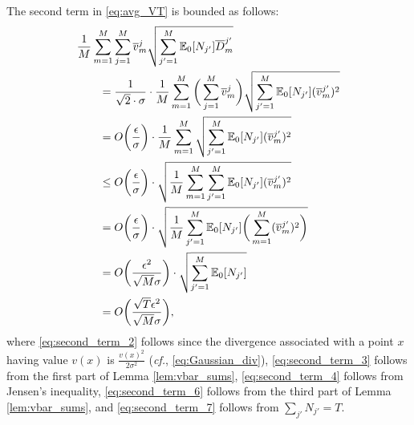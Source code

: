 \documentclass[english,onecolumn,final,11pt]{IEEEtran} %
\newcommand{\Dbar}{\overline{D}}
\begin{document}
The second term in \eqref{eq:avg_VT} is bounded as follows: {\allowdisplaybreaks
\begin{align}
	& \frac{1}{M}\sum_{m=1}^M \sum_{j=1}^M \vbar_m^j \sqrt{ \sum_{j'=1}^M \EE_0[N_{j'}]\Dbar_m^{j'} } \nonumber \\
	& \qquad =  \frac{1}{\sqrt{2} \cdot \sigma}\cdot\frac{1}{M}\sum_{m=1}^M \bigg(\sum_{j=1}^M \vbar_m^j\bigg) \sqrt{ \sum_{j'=1}^M \EE_0[N_{j'}](\vbar_m^{j'})^2 } \label{eq:second_term_2} \\
	& \qquad= O\bigg(\frac{\epsilon}{\sigma}\bigg)\cdot\frac{1}{M}\sum_{m=1}^M \sqrt{ \sum_{j'=1}^M \EE_0[N_{j'}](\vbar_m^{j'})^2 } \label{eq:second_term_3} \\
	&\qquad\le O\bigg(\frac{\epsilon}{\sigma}\bigg)\cdot\sqrt{ \frac{1}{M}\sum_{m=1}^M \sum_{j'=1}^M \EE_0[N_{j'}](\vbar_m^{j'})^2 } \label{eq:second_term_4} \\
	&\qquad =O\bigg(\frac{\epsilon}{\sigma}\bigg)\cdot\sqrt{ \frac{1}{M} \sum_{j'=1}^M \EE_0[N_{j'}]\bigg( \sum_{m=1}^M (\vbar_m^{j'})^2\bigg) } \label{eq:second_term_5} \\
	&\qquad =O\bigg(\frac{\epsilon^2}{\sqrt{M} \sigma}\bigg)\cdot\sqrt{ \sum_{j'=1}^M \EE_0[N_{j'}] } \label{eq:second_term_6} \\
	&\qquad = O\bigg(\frac{\sqrt{T}\epsilon^2}{\sqrt{M} \sigma}\bigg), \label{eq:second_term_7}
\end{align} }
where \eqref{eq:second_term_2} follows since the divergence associated with a point $x$ having value $v(x)$ is $\frac{v(x)^2}{2\sigma^2}$ (\emph{cf.}, \eqref{eq:Gaussian_div}), \eqref{eq:second_term_3} follows from the first part of Lemma \ref{lem:vbar_sums}, \eqref{eq:second_term_4} follows from Jensen's inequality, \eqref{eq:second_term_6} follows from the third part of Lemma \ref{lem:vbar_sums}, and \eqref{eq:second_term_7} follows from $\sum_{j'} N_{j'} = T$.
\end{document}
